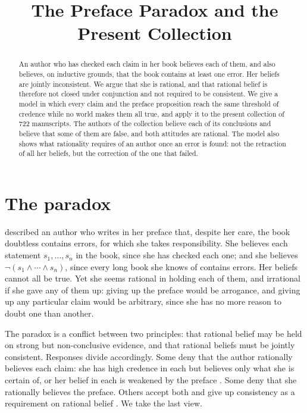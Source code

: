 \documentclass{situationist-preprint}
\title{The Preface Paradox and the Present Collection}
\begin{document}
\maketitle

\begin{abstract}
An author who has checked each claim in her book believes each of them, and also believes, on inductive grounds, that the book contains at least one error. Her beliefs are jointly inconsistent. We argue that she is rational, and that rational belief is therefore not closed under conjunction and not required to be consistent. We give a model in which every claim and the preface proposition reach the same threshold of credence while no world makes them all true, and apply it to the present collection of 722 manuscripts. The authors of the collection believe each of its conclusions and believe that some of them are false, and both attitudes are rational. The model also shows what rationality requires of an author once an error is found: not the retraction of all her beliefs, but the correction of the one that failed.
\end{abstract}

\section{The paradox}

\citet{Makinson1965} described an author who writes in her preface that, despite her care, the book doubtless contains errors, for which she takes responsibility. She believes each statement $s_1, \ldots, s_n$ in the book, since she has checked each one; and she believes $\neg(s_1 \wedge \cdots \wedge s_n)$, since every long book she knows of contains errors. Her beliefs cannot all be true. Yet she seems rational in holding each of them, and irrational if she gave any of them up: giving up the preface would be arrogance, and giving up any particular claim would be arbitrary, since she has no more reason to doubt one than another.

The paradox is a conflict between two principles: that rational belief may be held on strong but non-conclusive evidence, and that rational beliefs must be jointly consistent. Responses divide accordingly. Some deny that the author rationally believes each claim: she has high credence in each but believes only what she is certain of, or her belief in each is weakened by the preface \citep{Ryan1991}. Some deny that she rationally believes the preface. Others accept both and give up consistency as a requirement on rational belief \citep{Christensen2004}. We take the last view.
\end{document}
